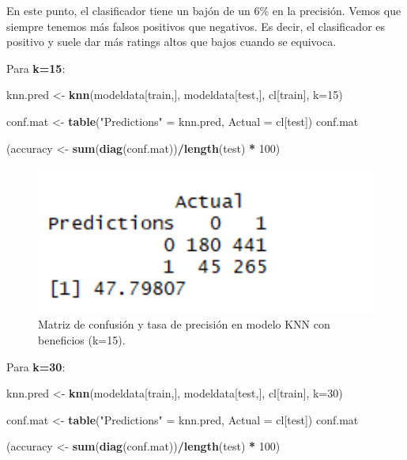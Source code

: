 \documentclass[spanish,]{article}
\newenvironment{Shaded}{\begin{snugshade}}{\end{snugshade}}
\newcommand{\KeywordTok}[1]{\textcolor[rgb]{0.13,0.29,0.53}{\textbf{#1}}}
\newcommand{\DataTypeTok}[1]{\textcolor[rgb]{0.13,0.29,0.53}{#1}}
\newcommand{\DecValTok}[1]{\textcolor[rgb]{0.00,0.00,0.81}{#1}}
\newcommand{\StringTok}[1]{\textcolor[rgb]{0.31,0.60,0.02}{#1}}
\newcommand{\OperatorTok}[1]{\textcolor[rgb]{0.81,0.36,0.00}{\textbf{#1}}}
\newcommand{\NormalTok}[1]{#1}
\begin{document}
En este punto, el clasificador tiene un bajón de un 6\% en la precisión.
Vemos que siempre tenemos más falsos positivos que negativos. Es decir,
el clasificador es positivo y suele dar más ratings altos que bajos
cuando se equivoca.

Para \textbf{k=15}:

\begin{Shaded}
\begin{Highlighting}[]
\NormalTok{knn.pred <-}\StringTok{ }\KeywordTok{knn}\NormalTok{(modeldata[train,], modeldata[test,], cl[train], }\DataTypeTok{k=}\DecValTok{15}\NormalTok{) }

\NormalTok{conf.mat <-}\StringTok{ }\KeywordTok{table}\NormalTok{(}\StringTok{"Predictions"}\NormalTok{ =}\StringTok{ }\NormalTok{knn.pred, }\DataTypeTok{Actual =}\NormalTok{ cl[test])}
\NormalTok{conf.mat}

\NormalTok{(accuracy <-}\StringTok{ }\KeywordTok{sum}\NormalTok{(}\KeywordTok{diag}\NormalTok{(conf.mat))}\OperatorTok{/}\KeywordTok{length}\NormalTok{(test) }\OperatorTok{*}\StringTok{ }\DecValTok{100}\NormalTok{)}
\end{Highlighting}
\end{Shaded}

\begin{figure}[h]
    \centering
    \includegraphics[width=1\textwidth]{figuras/KNN/benefits_k15.png}
    \caption{Matriz de confusión y tasa de precisión en modelo KNN con beneficios (k=15).}
    \label{fig:KNN:benefitsK15}
\end{figure}

Para \textbf{k=30}:

\begin{Shaded}
\begin{Highlighting}[]
\NormalTok{knn.pred <-}\StringTok{ }\KeywordTok{knn}\NormalTok{(modeldata[train,], modeldata[test,], cl[train], }\DataTypeTok{k=}\DecValTok{30}\NormalTok{) }

\NormalTok{conf.mat <-}\StringTok{ }\KeywordTok{table}\NormalTok{(}\StringTok{"Predictions"}\NormalTok{ =}\StringTok{ }\NormalTok{knn.pred, }\DataTypeTok{Actual =}\NormalTok{ cl[test])}
\NormalTok{conf.mat}

\NormalTok{(accuracy <-}\StringTok{ }\KeywordTok{sum}\NormalTok{(}\KeywordTok{diag}\NormalTok{(conf.mat))}\OperatorTok{/}\KeywordTok{length}\NormalTok{(test) }\OperatorTok{*}\StringTok{ }\DecValTok{100}\NormalTok{)}
\end{Highlighting}
\end{Shaded}
\end{document}
